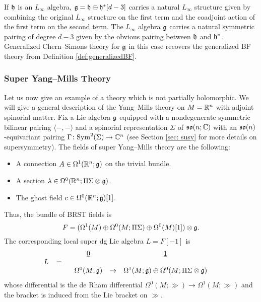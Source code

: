 \documentclass[10pt, oneside]{article}
\begin{document}
\begin{example}
If $\mathfrak h$ is an $L_\infty$ algebra, $\mathfrak g = \mathfrak h \oplus \mathfrak h^*[d-3]$ carries a natural $L_\infty$ structure given by combining the original $L_\infty$ structure on the first term and the coadjoint action of the first term on the second term. The $L_\infty$ algebra $\mathfrak g$ carries a natural symmetric pairing of degree $d-3$ given by the obvious pairing between $\mathfrak h$ and $\mathfrak h^*$. Generalized Chern--Simons theory for $\mathfrak g$ in this case recovers the generalized BF theory from Definition \ref{def:generalizedBF}.
\end{example}

\subsubsection{Super Yang--Mills Theory} \label{YM_section}

Let us now give an example of a theory which is not partially holomorphic. We will give a general description of the Yang--Mills theory on $M=\mathbb R^n$ with adjoint spinorial matter. Fix a Lie algebra $\mathfrak g$ equipped with a nondegenerate symmetric bilinear pairing $\langle -, -\rangle$ and a spinorial representation $\Sigma$ of $\mathfrak{so}(n; \mathbb C)$ with an $\mathfrak{so}(n)$-equivariant pairing $\Gamma \colon {\rm Sym}^2(\Sigma)\to \mathbb C^n$ (see Section \ref{sec: susy} for more details on supersymmetry). The fields of super Yang--Mills theory are the following:
\begin{itemize}
\item A connection $A \in \Omega^1(\mathbb R^n; \mathfrak g)$ on the trivial bundle.

\item A section $\lambda \in \Omega^0(\mathbb R^n; \Pi \Sigma \otimes \mathfrak g)$.

\item The ghost field $c\in\Omega^0(\mathbb R^n; \mathfrak g)[1]$.
\end{itemize}

Thus, the bundle of BRST fields is
\[F = (\Omega^1(M)\oplus \Omega^0(M; \Pi\Sigma)\oplus \Omega^0(M)[1])\otimes \mathfrak g.\]
The corresponding local super dg Lie algebra $L=F[-1]$ is
\[
L \;\;\; = \begin{array}{ccccc}
& \underline{0} & & \underline{1} & \\ 
& & & & \\
& \Omega^0(M; \mathfrak{g}) & \to & \Omega^1(M; \mathfrak{g}) \oplus \Omega^0(M; \Pi \Sigma \otimes \mathfrak{g}) & 
\end{array}
\]
whose differential is the de Rham differential $\Omega^0(M; \gg)\rightarrow \Omega^1(M; \gg)$ and the bracket is induced from the Lie bracket on $\gg$.
\end{document}
